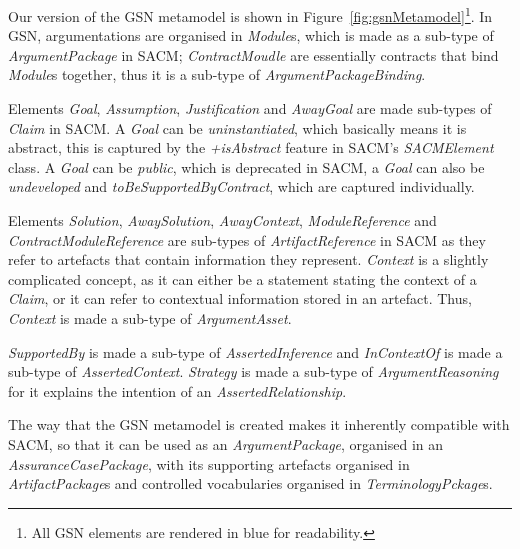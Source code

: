 Our version of the GSN metamodel is shown in Figure~\ref{fig:gsnMetamodel}\footnote{All GSN elements are rendered in blue for readability.}. 
In GSN, argumentations are organised in \textit{Module}s, which is made as a sub-type of \textit{ArgumentPackage} in SACM; \textit{ContractMoudle} are essentially contracts that bind \textit{Module}s together, thus it is a sub-type of \textit{ArgumentPackageBinding}. 

Elements \textit{Goal}, \textit{Assumption}, \textit{Justification} and \textit{AwayGoal} are made sub-types of \textit{Claim} in SACM. 
A \textit{Goal} can be \textit{uninstantiated}, which basically means it is abstract, this is captured by the \textit{+isAbstract} feature in SACM's \textit{SACMElement} class. 
A \textit{Goal} can be \textit{public}, which is deprecated in SACM, a \textit{Goal} can also be \textit{undeveloped} and \textit{toBeSupportedByContract}, which are captured individually. 

Elements \textit{Solution}, \textit{AwaySolution}, \textit{AwayContext}, \textit{ModuleReference} and \textit{ContractModuleReference} are sub-types of \textit{ArtifactReference} in SACM as they refer to artefacts that contain information they represent. 
\textit{Context} is a slightly complicated concept, as it can either be a statement stating the context of a \textit{Claim}, or it can refer to contextual information stored in an artefact. 
Thus, \textit{Context} is made a sub-type of \textit{ArgumentAsset}. 

\textit{SupportedBy} is made a sub-type of \textit{AssertedInference} and \textit{InContextOf} is made a sub-type of \textit{AssertedContext}. 
\textit{Strategy} is made a sub-type of \textit{ArgumentReasoning} for it explains the intention of an \textit{AssertedRelationship}.

The way that the GSN metamodel is created makes it inherently compatible with SACM, so that it can be used as an \textit{ArgumentPackage}, organised in an \textit{AssuranceCasePackage}, with its supporting artefacts organised in \textit{ArtifactPackage}s and controlled vocabularies organised in \textit{TerminologyPckage}s. 

